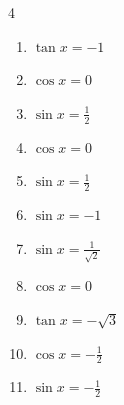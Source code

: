 \begin{multicols}{4}
\begin{enumerate}
  \item $\displaystyle \tan{x}  = -1$


  \item $\displaystyle \cos{x}  = 0$


  \item $\displaystyle \sin{x}  = \frac{1}{2}$


  \item $\displaystyle \cos{x}  = 0$


  \item $\displaystyle \sin{x}  = \frac{1}{2}$


\columnbreak %

  \item $\displaystyle \sin{x}  = -1$


  \item $\displaystyle \sin{x}  = \frac{1}{\sqrt{2}}$


  \item $\displaystyle \cos{x}  = 0$


  \item $\displaystyle \tan{x}  = -\sqrt{3}$


  \item $\displaystyle \cos{x}  = -\frac{1}{2}$


  \item $\displaystyle \sin{x}  = -\frac{1}{2}$



\end{enumerate}
\end{multicols}

